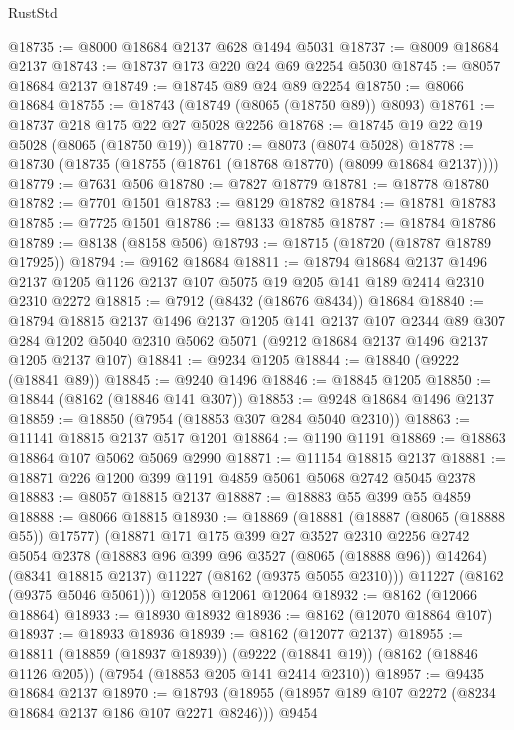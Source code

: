 \begin{lexlean}{RustStd}
\begin{coremodule}
@18735 := @8000 @18684 @2137 @628 @1494 @5031
@18737 := @8009 @18684 @2137
@18743 := @18737 @173 @220 @24 @69 @2254 @5030
@18745 := @8057 @18684 @2137
@18749 := @18745 @89 @24 @89 @2254
@18750 := @8066 @18684
@18755 := @18743 (@18749 (@8065 (@18750 @89)) @8093)
@18761 := @18737 @218 @175 @22 @27 @5028 @2256
@18768 := @18745 @19 @22 @19 @5028 (@8065 (@18750 @19))
@18770 := @8073 (@8074 @5028)
@18778 := @18730 (@18735 (@18755 (@18761 (@18768 @18770) (@8099 @18684 @2137))))
@18779 := @7631 @506
@18780 := @7827 @18779
@18781 := @18778 @18780
@18782 := @7701 @1501
@18783 := @8129 @18782
@18784 := @18781 @18783
@18785 := @7725 @1501
@18786 := @8133 @18785
@18787 := @18784 @18786
@18789 := @8138 (@8158 @506)
@18793 := @18715 (@18720 (@18787 @18789 @17925))
@18794 := @9162 @18684
@18811 := @18794
    @18684
    @2137
    @1496
    @2137
    @1205
    @1126
    @2137
    @107
    @5075
    @19
    @205
    @141
    @189
    @2414
    @2310
    @2310
    @2272
@18815 := @7912 (@8432 (@18676 @8434)) @18684
@18840 := @18794
    @18815
    @2137
    @1496
    @2137
    @1205
    @141
    @2137
    @107
    @2344
    @89
    @307
    @284
    @1202
    @5040
    @2310
    @5062
    @5071
    (@9212 @18684 @2137 @1496 @2137 @1205 @2137 @107)
@18841 := @9234 @1205
@18844 := @18840 (@9222 (@18841 @89))
@18845 := @9240 @1496
@18846 := @18845 @1205
@18850 := @18844 (@8162 (@18846 @141 @307))
@18853 := @9248 @18684 @1496 @2137
@18859 := @18850 (@7954 (@18853 @307 @284 @5040 @2310))
@18863 := @11141 @18815 @2137 @517 @1201
@18864 := @1190 @1191
@18869 := @18863 @18864 @107 @5062 @5069 @2990
@18871 := @11154 @18815 @2137
@18881 := @18871 @226 @1200 @399 @1191 @4859 @5061 @5068 @2742 @5045 @2378
@18883 := @8057 @18815 @2137
@18887 := @18883 @55 @399 @55 @4859
@18888 := @8066 @18815
@18930 := @18869
    (@18881
      (@18887 (@8065 (@18888 @55)) @17577)
      (@18871
        @171
        @175
        @399
        @27
        @3527
        @2310
        @2256
        @2742
        @5054
        @2378
        (@18883 @96 @399 @96 @3527 (@8065 (@18888 @96)) @14264)
        (@8341 @18815 @2137)
        @11227
        (@8162 (@9375 @5055 @2310)))
      @11227
      (@8162 (@9375 @5046 @5061)))
    @12058
    @12061
    @12064
@18932 := @8162 (@12066 @18864)
@18933 := @18930 @18932
@18936 := @8162 (@12070 @18864 @107)
@18937 := @18933 @18936
@18939 := @8162 (@12077 @2137)
@18955 := @18811
    (@18859 (@18937 @18939))
    (@9222 (@18841 @19))
    (@8162 (@18846 @1126 @205))
    (@7954 (@18853 @205 @141 @2414 @2310))
@18957 := @9435 @18684 @2137
@18970 := @18793 (@18955 (@18957 @189 @107 @2272 (@8234 @18684 @2137 @186 @107 @2271 @8246))) @9454

\end{coremodule}
\end{lexlean}
